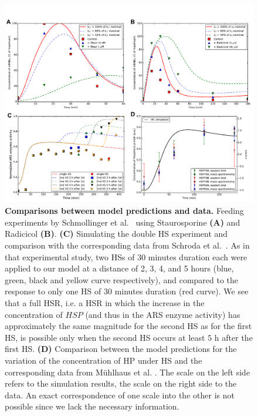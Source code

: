 \documentclass[oneside, 10pt, a4paper, twocolumn]{article}
\begin{document}
\begin{figure}
\centering
\includegraphics[width=\textwidth]{Figure3_Paper.pdf}
\caption{\small{\textbf{Comparisons between model predictions and data.} Feeding experiments by Schmollinger et al.~\cite{Schmollinger2013} using Staurosporine \textbf{(A)} and Radicicol \textbf{(B)}. \textbf{(C)} Simulating the double HS experiment and comparison with the corresponding data from Schroda et al.~\cite{Schroda2000}. {As in that experimental study, two HSs of 30 minutes duration each were applied to our model at a distance of 2, 3, 4, and 5 hours (blue, green, black and yellow curve respectively), and compared to the response to only one HS of 30 minutes duration (red curve).} We see that a full HSR{, i.e. a HSR in which the increase in the concentration of $HSP$ (and thus in the ARS enzyme activity) has approximately the same magnitude for the second HS as for the first HS,} is possible only when the second HS occurs at least $5$ h after the first HS. \textbf{(D)} Comparison between the model predictions for the variation of the concentration of HP under HS and the corresponding data from M\"uhlhaus et al. \cite{Muehlhaus2011}. The scale on the left side refers to the simulation results, the scale on the right side to the data. An exact correspondence of one scale into the other is not possible since we lack the necessary information.}
}
\label{Figure3label}
\end{figure}

\clearpage
\end{document}
